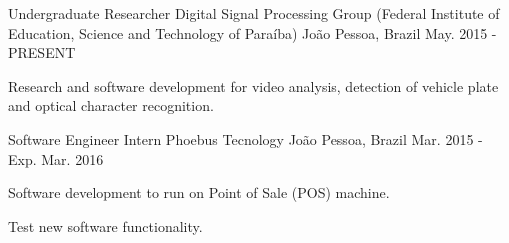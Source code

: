 

\begin{cventries}

  \cventry
    {Undergraduate Researcher} %
    {Digital Signal Processing Group (Federal Institute of Education, Science and Technology
of Paraíba) } %
    {João Pessoa, Brazil} %
    {May. 2015 - PRESENT} %
    {
      \begin{cvitems} %
        \item {Research and software development for video analysis, detection of vehicle plate and optical character recognition.}
      \end{cvitems}
    }

  \cventry
    {Software Engineer Intern} %
    {Phoebus Tecnology} %
    {João Pessoa, Brazil} %
    {Mar. 2015 - Exp. Mar. 2016} %
    {
      \begin{cvitems} %
        \item {Software development to run on Point of Sale (POS) machine.}
        \item {Test new software functionality.}
      \end{cvitems}
    }

\end{cventries}
